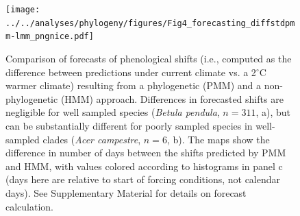 \documentclass[11pt]{article}
\begin{document}
\begin{figure} 
  \begin{center}
  \texttt{[image: ../../analyses/phylogeny/figures/Fig4\_forecasting\_diffstdpmm-lmm\_pngnice.pdf]}
  \caption{Comparison of forecasts of phenological shifts (i.e., computed as the difference between predictions under current climate vs. a 2$^{\circ}$C warmer climate) resulting from a phylogenetic (PMM) and a non-phylogenetic (HMM) approach. Differences in forecasted shifts are negligible for well sampled species (\emph{Betula pendula}, $n = 311$, a), but can be substantially different for poorly sampled species in well-sampled clades (\emph{Acer campestre}, $n = 6$, b). The maps show the difference in number of days between the shifts predicted by PMM and HMM, with values colored according to histograms in panel c (days here are relative to start of forcing conditions, not calendar days). See Supplementary Material for details on forecast calculation.}
  \label{fig:forecast}
  \end{center}
\end{figure}

\clearpage
\end{document}
